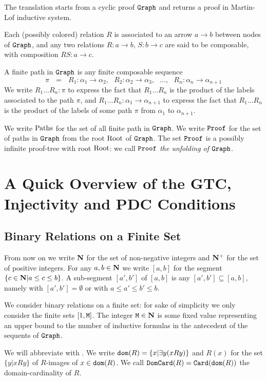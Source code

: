 \documentclass{lmcs}
\begin{document}
The translation starts from a cyclic proof ${\tt Graph}$ and returns a proof in Martin-Lof
inductive system.

Each (possibly colored) relation $R$ is associated to an arrow $a \rightarrow b$ 
between nodes of ${\tt Graph}$, and any two relations $R:a \rightarrow b$, $S:b \rightarrow c$
are said to be composable, with composition $RS: a \rightarrow c$. 

A finite path in ${\tt Graph}$ is any finite composable sequence 
$$
\pi  \ \ \
=  \ \ \
R_1:\alpha_1 \rightarrow \alpha_2, \ \ \ 
R_2:\alpha_2 \rightarrow \alpha_3, \ \ \ 
\ldots, \ \ \ 
R_n:\alpha_n \rightarrow \alpha_{n+1}
$$
We write $R_1 \ldots R_n : \pi$ to express the fact that $R_1 \ldots R_n$ is the product
of the labels associated to the path $\pi$, and $R_1 \ldots R_n : \alpha_1 \rightarrow \alpha_{n+1}$ to express the fact that $R_1 \ldots R_n$ is the product
of the labels of some path $\pi$ from $\alpha_1$ to $\alpha_{n+1}$.

We write ${\rm Paths}$ for the set of all finite path in ${\tt Graph}$. We write ${\tt Proof}$ for the 
set of paths in ${\tt Graph}$ from the root ${\rm Root}$ of ${\tt Graph}$. The set ${\tt Proof}$ is a 
possibly infinite proof-tree with root ${\rm Root}$: 
we call ${\tt Proof}$ \emph{the unfolding of ${\tt Graph}$}.


\section{A Quick Overview of the GTC, Injectivity and PDC Conditions}

\subsection{Binary Relations on a Finite Set}
From now on we write ${\bf N}$ for the set of non-negative integers and ${\bf N}^+$ for the set of positive integers. For any $a,b \in {\bf N}$
we write $[a,b]$ for the segment $\{c \in {\bf N} | a \le c \le b\}$. A sub-segment $[a',b']$ of
$[a,b]$ is any $[a',b'] \subseteq [a,b]$, namely with $[a',b']=\emptyset$ or with
$a \le a' \le b' \le b$.

We consider binary relations on a finite set: for sake of simplicity we only 
consider the finite sets $[1,\MaxInd]$. The integer ${\tt M} \in {\bf N}$ is some
fixed value representing an upper bound to the number of inductive formulas in the
antecedent of the sequents of ${\tt Graph}$. 

We will abbreviate \quotationMarks{binary relations on $[1,\MaxInd]$} with
\quotationMarks{relations}. We write ${\tt dom}(R) = \{x | \exists y (x R y)\}$ and
$R(x)$ for the set $\{y | x R y\}$ of $R$-images of $x \in {\tt dom}(R)$. 
We call ${\tt DomCard}(R) = {\tt Card}({\tt dom}(R))$ 
the domain-cardinality of $R$. 
\end{document}

